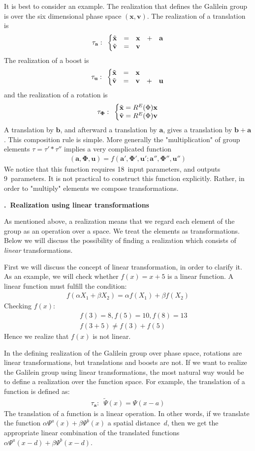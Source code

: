 \documentclass[onecolumn,fleqn, 11pt]{revtex4}
\newcommand{\amatrix}[1]{\begin{matrix} #1 \end{matrix}}
\newcommand{\beq}{\begin{eqnarray}}
\newcommand{\eeq}{\end{eqnarray}}
\renewcommand{\thesubsection}{\arabic{subsection}}
\renewcommand{\thesubsubsection}{\arabic{subsubsection}}
\newcommand{\sheadC}[1]
{
\addtocounter{subsubsection}{1}
\vspace{5mm}
{\bf \thesubsection.\thesubsubsection \ #1}  
\nopagebreak
\phantomsection
}
\begin{document}
It is best to consider an example. 
The realization that defines the Galilein group is over 
the six dimensional phase space ${(\mathbf{x},\mathbf{v})}$. 
The realization of a translation is 
\beq
\tau_{\mathbf{a}} : \,\,\, \left\{\amatrix{\tilde{\mathbf{x}}&=&\mathbf{x}&+&\mathbf{a}\cr 
\tilde{\mathbf{v}}&=&\mathbf{v}& & }\right. 
\eeq
The realization of a boost is 
\beq
\tau_{\mathbf{u}}: \,\,\, \left\{\amatrix{\tilde{\mathbf{x}}&=&\mathbf{x}& &\cr
\tilde{\mathbf{v}}&=&\mathbf{v}&+&\mathbf{u} }\right. 
\eeq
and the realization of a rotation is 
\beq
\tau_{\mathbf{\Phi}}:\,\,\, \left\{\amatrix{\tilde{\mathbf{x}}
=R^E(\Phi)\mathbf{x}\cr \tilde{\mathbf{v}}
= R^E(\Phi) \mathbf{v} }\right. 
\eeq
A translation by ${\mathbf{b}}$, 
and afterward a translation by ${\mathbf{a}}$, 
gives a translation by ${\mathbf{b}+\mathbf{a}}$. 
This composition rule is simple. 
More generally the "multiplication"  
of group elements ${\tau = \tau'*\tau''}$  
implies a very complicated function  
\beq
(\mathbf{a},\mathbf{\Phi},\mathbf{u}) 
= f(\mathbf{a}',\mathbf{\Phi}',\mathbf{u}' ; \mathbf{a}'',\mathbf{\Phi}'',\mathbf{u}'') 
\eeq
We notice that this function requires 18~input parameters, 
and outputs 9~parameters. It is not practical to construct this 
function explicitly. Rather, in order to "multiply" elements 
we compose transformations.   

\sheadC{Realization using linear transformations}

As mentioned above, a realization means that we regard  
each element of the group as an operation over a space. 
We treat the elements as transformations. Below 
we will discuss the possibility of finding a realization 
which consists of {\em linear} transformations. 

First we will discuss the concept of linear transformation, 
in order to clarify it. As an example, we will check 
whether ${f(x) = x + 5}$ is a linear function. 
A linear function must fulfill the condition:
\beq
f(\alpha X_1+\beta X_2)=\alpha f(X_1)+\beta f(X_2)
\eeq
Checking ${f(x)}$:
\beq
&& f(3) = 8 , f(5) = 10, f(8)=13
\\ \nonumber
&& f(3+5) \neq f(3) + f(5)
\eeq
Hence we realize that ${f(x)}$ is not linear. 

In the defining realization of the Galilein group 
over phase space, rotations are linear transformations, 
but translations and boosts are not. If we want to realize 
the Galilein group using linear transformations, the most natural 
way would be to define a realization over the function space. 
For example, the translation of a function is defined as:
\beq
\tau_{\mathbf{a}} : \,\,\, \tilde{\Psi}(x) = \Psi(x-a) 
\eeq
The translation of a function is a linear operation. 
In other words, if we translate the function ${\alpha\Psi^a(x)+\beta\Psi^b(x)}$ 
a spatial distance~$d$, then we get the appropriate linear combination 
of the translated functions ${\alpha\Psi^a(x-d)+\beta\Psi^b(x-d)}$.
\end{document}
